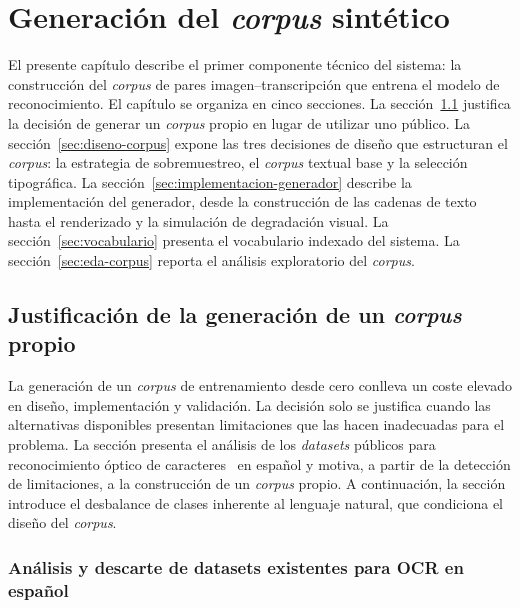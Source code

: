 \setcounter{chapter}{1}

\chapter{Generación del \textit{corpus} sintético}\label{chap:corpus}

El presente capítulo describe el primer componente técnico del sistema: la construcción del \textit{corpus} de pares imagen--transcripción que entrena el modelo de reconocimiento. El capítulo se organiza en cinco secciones. La sección~\ref{sec:justificacion-corpus} justifica la decisión de generar un \textit{corpus} propio en lugar de utilizar uno público. La sección~\ref{sec:diseno-corpus} expone las tres decisiones de diseño que estructuran el \textit{corpus}: la estrategia de sobremuestreo, el \textit{corpus} textual base y la selección tipográfica. La sección~\ref{sec:implementacion-generador} describe la implementación del generador, desde la construcción de las cadenas de texto hasta el renderizado y la simulación de degradación visual. La sección~\ref{sec:vocabulario} presenta el vocabulario indexado del sistema. La sección~\ref{sec:eda-corpus} reporta el análisis exploratorio del \textit{corpus}.

\section{Justificación de la generación de un \textit{corpus} propio}
\label{sec:justificacion-corpus}

La generación de un \textit{corpus} de entrenamiento desde cero conlleva un coste elevado en diseño, implementación y validación. La decisión solo se justifica cuando las alternativas disponibles presentan limitaciones que las hacen inadecuadas para el problema. La sección presenta el análisis de los \textit{datasets} públicos para reconocimiento óptico de caracteres~\cite{mori1992hocr} en español y motiva, a partir de la detección de limitaciones, a la construcción de un \textit{corpus} propio. A continuación, la sección introduce el desbalance de clases inherente al lenguaje natural, que condiciona el diseño del \textit{corpus}.

\subsection{Análisis y descarte de datasets existentes para OCR en español}
\label{subsec:descarte-datasets}

